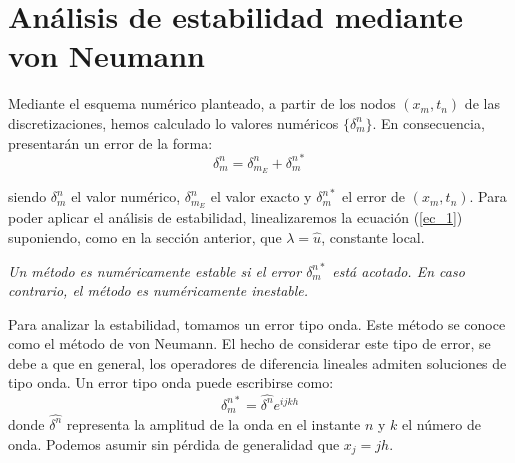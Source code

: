 \section{Análisis de estabilidad mediante von Neumann}

 Mediante el esquema numérico planteado, a partir de los nodos $(x_{m},t_{n})$ de las discretizaciones, hemos calculado lo valores numéricos $\{\delta_{m}^{n}\}$. En consecuencia, presentarán un error de la forma:
$$\delta_{m}^{n}=\delta_{m_{E}}^{n}+\delta_{m}^{n*}$$ 

siendo $\delta_{m}^{n}$ el valor numérico, $\delta_{m_{E}}^{n}$ el valor exacto y $\delta_{m}^{n*}$ el error de $(x_{m},t_{n})$. Para poder aplicar el análisis de estabilidad, linealizaremos la ecuación (\ref{ec_1}) suponiendo, como en la sección anterior, que $\lambda=\hat{u}$, constante local.

\begin{definicion1}[label={definicion},nameref={Title or anything else}]
    \textit{Un método es numéricamente estable si el error $\delta_{m}^{n*}$ está acotado. En caso contrario, el método es numéricamente inestable.}
\end{definicion1}

Para analizar la estabilidad, tomamos un error tipo onda. Este método se conoce como el método de von Neumann. El hecho de considerar este tipo de error, se debe a que en general, los operadores de diferencia lineales admiten soluciones de tipo onda. Un error tipo onda puede escribirse como:
\begin{equation}
\label{VN}
   \delta_{m}^{n*}=\widehat{\delta^{n}}e^{ijkh} 
\end{equation}
donde $\widehat{\delta^{n}}$ representa la amplitud de la onda en el instante $n$ y $k$ el número de onda. Podemos asumir sin pérdida de generalidad que $x_{j}=jh.$


